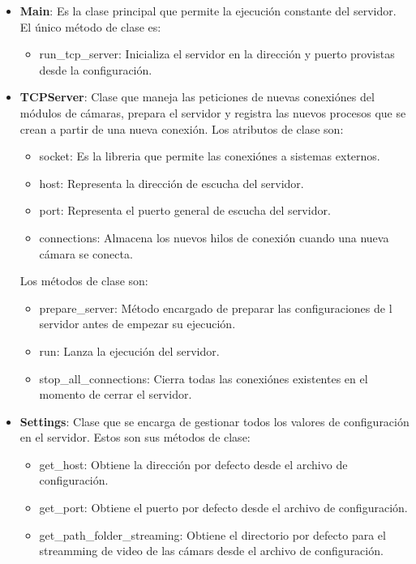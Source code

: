 \begin{itemize}
    \item \textbf{Main}: Es la clase principal que permite la ejecución constante del servidor. El único método de clase es:
        \begin{itemize}
            \item run\_tcp\_server: Inicializa el servidor en la dirección y puerto provistas desde la configuración.
        \end{itemize}
    \item \textbf{TCPServer}: Clase que maneja las peticiones de nuevas conexiónes del módulos de cámaras, prepara el servidor y registra las nuevos procesos que se crean a partir de una nueva conexión. Los atributos de clase son:
        \begin{itemize}
            \item socket: Es la libreria que permite las conexiónes a sistemas externos.
            \item host: Representa la dirección de escucha del servidor.
            \item port: Representa el puerto general de escucha del servidor.
            \item connections: Almacena los nuevos hilos de conexión cuando una nueva cámara se conecta.
        \end{itemize}
        Los métodos de clase son:
        \begin{itemize}
            \item prepare\_server: Método encargado de preparar las configuraciones de l servidor antes de empezar su ejecución.
            \item run: Lanza la ejecución del servidor.
            \item stop\_all\_connections: Cierra todas las conexiónes existentes en el momento de cerrar el servidor.
        \end{itemize}
    \item \textbf{Settings}: Clase que se encarga de gestionar todos los valores de configuración en el servidor. Estos son sus métodos de clase:
        \begin{itemize}
            \item get\_host: Obtiene la dirección por defecto desde el archivo de configuración.
            \item get\_port: Obtiene el puerto por defecto desde el archivo de configuración.
            \item get\_path\_folder\_streaming: Obtiene el directorio por defecto para el streamming de video de las cámars desde el archivo de configuración.

\end{itemize}
\end{itemize}
